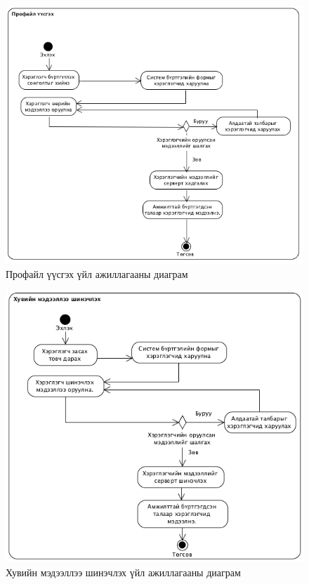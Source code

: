 \begin{figure}[H]
  \centering
	\includegraphics[width=\textwidth]{Figures/shinjilgee/activity/profile_uusgeh.png}
	\caption{Профайл үүсгэх үйл ажиллагааны диаграм}
\end{figure}

\begin{figure}[H]
  \centering
	\includegraphics[width=\textwidth]{Figures/shinjilgee/activity/huviin_medeellee_shinchleh.png}
	\caption{Хувийн мэдээллээ шинэчлэх үйл ажиллагааны диаграм}
\end{figure}

